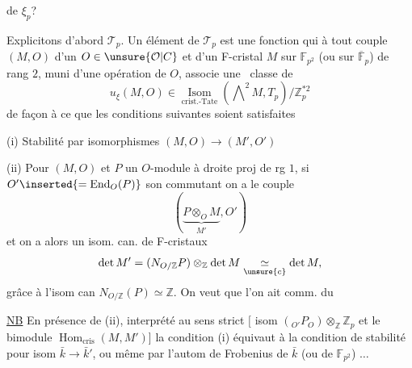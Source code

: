 
 de $\xi_p$?

Explicitons d'abord $\mathcal T_p$. Un élément \inserted{$\xi$} de $\mathcal T_p$ est une fonction qui à tout couple $(M,O)$ d'un $O\in\unsure{\mathcal O|C}$ et d'un F-cristal $M$ sur $\mathbb F_{p^2}$ (ou sur $\overline{\mathbb F}_p$) de rang $2$, muni d'une opération de $O$, associe une \ classe de
\[
u_\xi(M,O)\in
\underset{\text{crist.-Tate}}{\operatorname{Isom}}(\mathop{\bigwedge}\nolimits^2 M,T_p)/
\mathbb Z_p^{*2}
\]
de façon à ce que les conditions suivantes soient satisfaites

(i) Stabilité par isomorphismes $(M,O)\longrightarrow(M',O')$

(ii) Pour $(M,O)$ et $P$ un $O$-module à droite proj de rg $1$, si $O'\inserted{=\operatorname{End}_O(P)}$  son commutant on a le couple
\[
(\underbrace{P\otimes_O M}_{M'},O')
\]
et on a alors un isom. can. de F-cristaux
\[
\det M'=(N_{O/\mathbb Z}P)\otimes_{\mathbb Z}\det M
\underset{\unsure{c}}{\simeq}\det M,
\]
grâce à l'isom can $N_{O/\mathbb Z}(P)\simeq\mathbb Z$.
On veut que l'on ait comm. du

\uline{NB} En présence de (ii),  interprété au sens strict
$[$
isom  
$({}_{O'}P_O)\otimes_{\mathbb Z}\mathbb Z_p$
et le bimodule $\operatorname{Hom}_{\mathrm{cris}}(M,M')$]
la condition (i) équivaut à la condition de stabilité pour isom
$\bar k\longrightarrow\bar k'$, ou même par l'autom de Frobenius de $\bar k$ (ou de $\mathbb F_{p^2}$) $\ldots$
